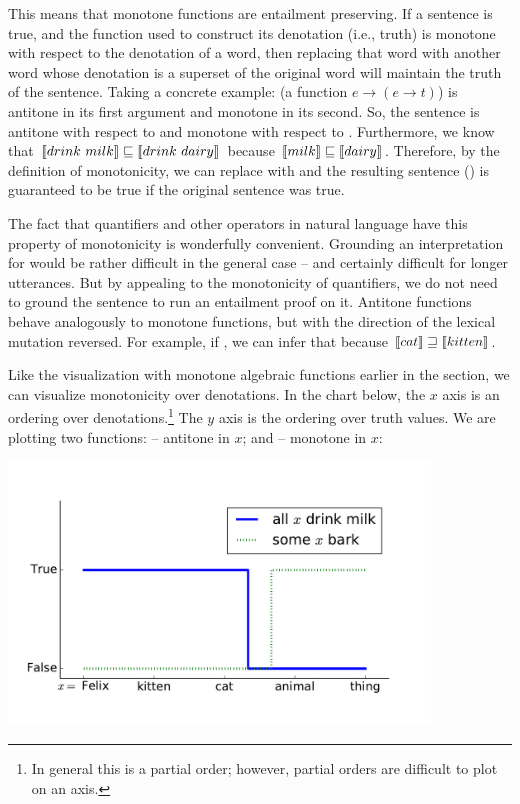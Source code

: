 This means that monotone functions are entailment preserving.
If a sentence is true, and the function used to construct its denotation (i.e., truth)
  is monotone with respect to the denotation of a word, then replacing that word with
  another word whose denotation is a superset of the original word will maintain
  the truth of the sentence.
Taking a concrete example:  (a function $e \rightarrow (e \rightarrow t)$)
  is antitone in its first argument and monotone in its second.
So, the sentence  is antitone with respect to  and
  monotone with respect to .
Furthermore, we know that 
  $\llbracket drink ~ milk\rrbracket \sqsubseteq \llbracket drink~dairy\rrbracket$
  because $\llbracket milk\rrbracket \sqsubseteq \llbracket dairy\rrbracket$.
Therefore, by the definition of monotonicity, we can replace  with
   and the resulting sentence ()
  is guaranteed to be true if the original sentence was true.

The fact that quantifiers and other operators in natural language have this
  property of monotonicity is wonderfully convenient.
Grounding an interpretation for  would be rather
  difficult in the general case -- and certainly difficult for longer utterances.
But by appealing to the monotonicity of quantifiers, we do not need to ground
  the sentence to run an entailment proof on it.
Antitone functions behave analogously to monotone functions, but with the 
  direction of the lexical mutation reversed.
For example, if , we can infer that 
   because 
  $\llbracket cat \rrbracket \sqsupseteq \llbracket kitten\rrbracket$.

Like the visualization with monotone algebraic functions earlier in the section,
  we can visualize monotonicity over denotations.
In the chart below, the $x$ axis is an ordering over denotations.\footnote{
    In general this is a partial order; however, partial orders are difficult
    to plot on an axis.
    }
The $y$ axis is the ordering over truth values.
We are plotting two functions:  -- antitone in $x$; and
   -- monotone in $x$:

\begin{center}
\includegraphics[height=7cm]{img/monotonicity_lex_all.pdf}
\end{center}

